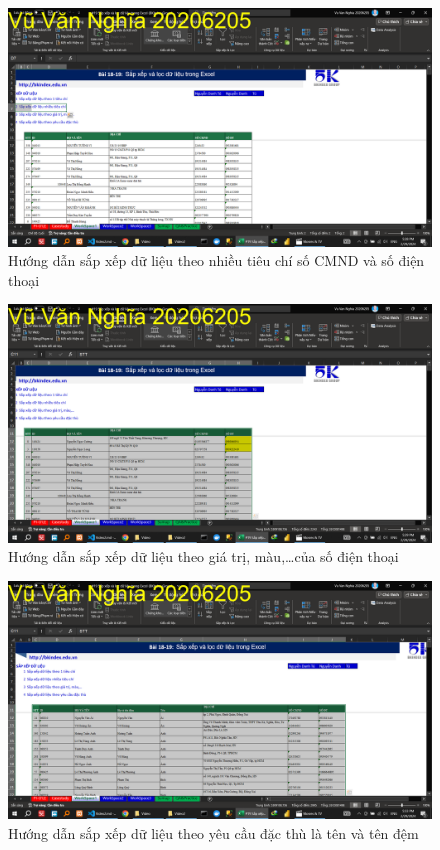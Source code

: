 \documentclass{article}
\begin{document}
\begin{figure}[h]
    \centering
    \includegraphics[scale = 0.15]{Video2/HuongDan/1.png}
    \caption{Hướng dẫn sắp xếp dữ liệu theo nhiều tiêu chí số CMND và số điện thoại}
\end{figure}

\begin{figure}[h]
    \centering
    \includegraphics[scale = 0.15]{Video2/HuongDan/2.png}
    \caption{Hướng dẫn sắp xếp dữ liệu theo giá trị, màu,\dots của số điện thoại}
\end{figure}

\begin{figure}[h]
    \centering
    \includegraphics[scale = 0.15]{Video2/HuongDan/3.png}
    \caption{Hướng dẫn sắp xếp dữ liệu theo yêu cầu đặc thù là tên và tên đệm}
\end{figure}
\end{document}
